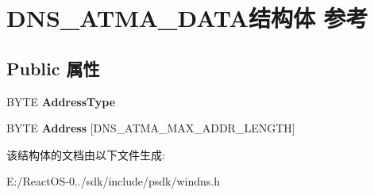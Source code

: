\hypertarget{struct_d_n_s___a_t_m_a___d_a_t_a}{}\section{D\+N\+S\+\_\+\+A\+T\+M\+A\+\_\+\+D\+A\+T\+A结构体 参考}
\label{struct_d_n_s___a_t_m_a___d_a_t_a}
\subsection*{Public 属性}
\begin{DoxyCompactItemize}
\item 
\mbox{\label{struct_d_n_s___a_t_m_a___d_a_t_a_acc0803868d41bf1438e961f53b5a5996}} 
B\+Y\+TE {\bfseries Address\+Type}
\item 
\mbox{\label{struct_d_n_s___a_t_m_a___d_a_t_a_a6010b89253a0b80b8bb72fde36067be3}} 
B\+Y\+TE {\bfseries Address} \mbox{[}D\+N\+S\+\_\+\+A\+T\+M\+A\+\_\+\+M\+A\+X\+\_\+\+A\+D\+D\+R\+\_\+\+L\+E\+N\+G\+TH\mbox{]}
\end{DoxyCompactItemize}


该结构体的文档由以下文件生成\+:\begin{DoxyCompactItemize}
\item 
E\+:/\+React\+O\+S-\/0../sdk/include/psdk/windns.\+h\end{DoxyCompactItemize}
